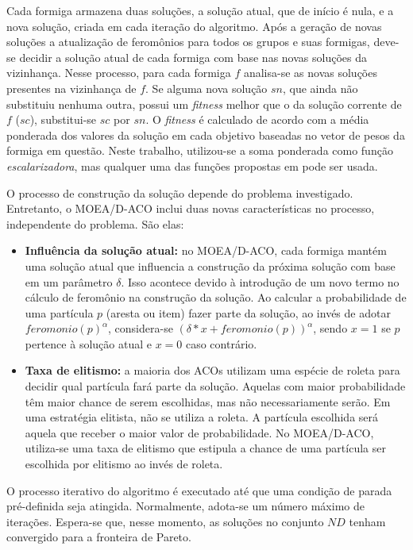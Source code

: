 Cada formiga armazena duas soluções, a solução atual, que de início é nula, e a nova solução, criada em cada iteração do algoritmo. Após a geração de novas soluções a atualização de feromônios para todos os grupos e suas formigas, deve-se decidir a solução atual de cada formiga com base nas novas soluções da vizinhança. Nesse processo, para cada formiga $f$ analisa-se as novas soluções presentes na vizinhança de $f$. Se alguma nova solução $sn$, que ainda não substituiu nenhuma outra, possui um \textit{fitness} melhor que o da solução corrente de $f$ ($sc$), substitui-se $sc$ por $sn$. O \textit{fitness} é calculado de acordo com a média ponderada dos valores da solução em cada objetivo baseadas no vetor de pesos da formiga em questão. Neste trabalho, utilizou-se a soma ponderada como função \textit{escalarizadora}, mas qualquer uma das funções propostas em \cite{Zhang2007} pode ser usada.

O processo de construção da solução depende do problema investigado. Entretanto, o MOEA/D-ACO inclui duas novas características no processo, independente do problema. São elas:

\begin{itemize}
	\item \textbf{Influência da solução atual:} no MOEA/D-ACO, cada formiga mantém uma solução atual que influencia a construção da próxima solução com base em um parâmetro $\delta$. Isso acontece devido à introdução de um novo termo no cálculo de feromônio na construção da solução. Ao calcular a probabilidade de uma partícula $p$ (aresta ou item) fazer parte da solução, ao invés de adotar $feromonio(p)^\alpha$, considera-se $(\delta * x + feromonio(p))^\alpha$, sendo $x = 1$ se $p$ pertence à solução atual e $x = 0$ caso contrário.
	\item \textbf{Taxa de elitismo:} a maioria dos ACOs utilizam uma espécie de roleta para decidir qual partícula fará parte da solução. Aquelas com maior probabilidade têm maior chance de serem escolhidas, mas não necessariamente serão. Em uma estratégia elitista, não se utiliza a roleta. A partícula escolhida será aquela que receber o maior valor de probabilidade. No MOEA/D-ACO, utiliza-se uma taxa de elitismo que estipula a chance de uma partícula ser escolhida por elitismo ao invés de roleta.
\end{itemize}

O processo iterativo do algoritmo é executado até que uma condição de parada pré-definida seja atingida. Normalmente, adota-se um número máximo de iterações. Espera-se que, nesse momento, as soluções no conjunto $ND$ tenham convergido para a fronteira de Pareto.

